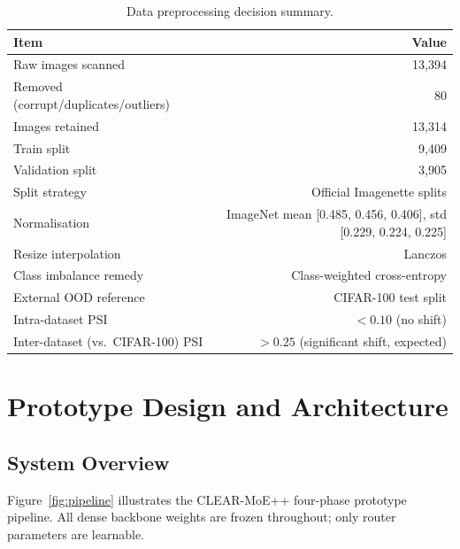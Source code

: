 \documentclass[12pt,a4paper]{article}
\begin{document}
\begin{table}[H]
\centering
\caption{Data preprocessing decision summary.}
\label{tab:eda_summary}
\begin{tabular}{lr}
\toprule
\textbf{Item} & \textbf{Value} \\
\midrule
Raw images scanned            & 13,394 \\
Removed (corrupt/duplicates/outliers) & 80 \\
Images retained               & 13,314 \\
Train split                   & 9,409 \\
Validation split              & 3,905 \\
Split strategy                & Official Imagenette splits \\
Normalisation                 & ImageNet mean [0.485, 0.456, 0.406], std [0.229, 0.224, 0.225] \\
Resize interpolation          & Lanczos \\
Class imbalance remedy        & Class-weighted cross-entropy \\
External OOD reference        & CIFAR-100 test split \\
Intra-dataset PSI             & $< 0.10$ (no shift) \\
Inter-dataset (vs.\ CIFAR-100) PSI & $> 0.25$ (significant shift, expected) \\
\bottomrule
\end{tabular}
\end{table}

\section{Prototype Design and Architecture}
\label{sec:prototype}

\subsection{System Overview}

Figure~\ref{fig:pipeline} illustrates the CLEAR-MoE++ four-phase prototype pipeline. All dense backbone weights are frozen throughout; only router parameters are learnable.
\end{document}
